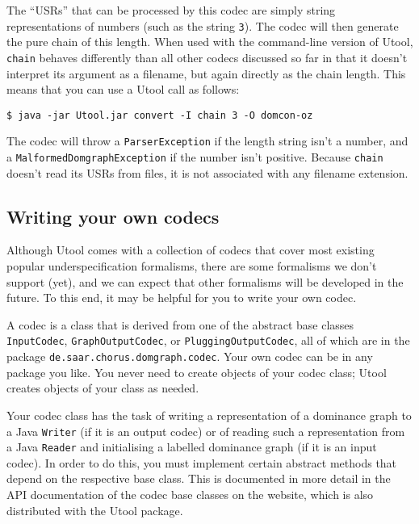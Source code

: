 The ``USRs'' that can be processed by this codec are simply string
representations of numbers (such as the string \verb?3?). The codec
will then generate the pure chain of this length. When used with the
command-line version of Utool, \verb?chain? behaves differently than
all other codecs discussed so far in that it doesn't interpret its
argument as a filename, but again directly as the chain length. This
means that you can use a Utool call as follows:

\begin{verbatim}
$ java -jar Utool.jar convert -I chain 3 -O domcon-oz
\end{verbatim}

The codec will throw a \verb?ParserException? if the length string
isn't a number, and a \verb?MalformedDomgraphException? if the number
isn't positive. Because \verb?chain? doesn't read its USRs from files,
it is not associated with any filename extension.






\subsection{Writing your own codecs}

Although Utool comes with a collection of codecs that cover most
existing popular underspecification formalisms, there are some
formalisms we don't support (yet), and we can expect that other
formalisms will be developed in the future. To this end, it may be
helpful for you to write your own codec.

A codec is a class that is derived from one of the abstract base
classes \verb?InputCodec?, \verb?GraphOutputCodec?, or
\verb?PluggingOutputCodec?, all of which are in the package
\verb?de.saar.chorus.domgraph.codec?. Your own codec can be in any
package you like. You never need to create objects of your codec
class; Utool creates objects of your class as needed.

Your codec class has the task of writing a representation of a
dominance graph to a Java \verb?Writer? (if it is an output codec) or
of reading such a representation from a Java \verb?Reader? and
initialising a labelled dominance graph (if it is an input codec). In
order to do this, you must implement certain abstract methods that
depend on the respective base class. This is documented in more detail
in the API documentation of the codec base classes on the website,
which is also distributed with the Utool package.

